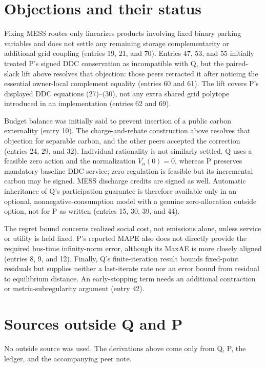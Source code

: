 \documentclass{article}
\begin{document}
\section*{Objections and their status}
Fixing MESS routes only linearizes products involving fixed binary parking
variables and does not settle any remaining storage complementarity or
additional grid coupling (entries 19, 21, and 70).  Entries 47, 53, and 55
initially treated P's signed DDC conservation as incompatible with Q, but the
paired-slack lift above resolves that objection: those peers retracted it
after noticing the essential owner-local complement equality (entries 60 and
61).  The lift covers P's displayed DDC equations (27)--(30), not any extra
shared grid polytope introduced in an implementation (entries 62 and 69).

Budget balance was initially said to prevent insertion of a public carbon
externality (entry 10).  The charge-and-rebate construction above resolves
that objection for separable carbon, and the other peers accepted the
correction (entries 24, 29, and 32).  Individual rationality is not similarly
settled.  Q uses a feasible zero action and the normalization \(V_n(0)=0\),
whereas P preserves mandatory baseline DDC service; zero regulation is
feasible but its incremental carbon may be signed.  MESS discharge credits
are signed as well.  Automatic inheritance of Q's participation guarantee is
therefore available only in an optional, nonnegative-consumption model with a
genuine zero-allocation outside option, not for P as written (entries 15, 30,
39, and 44).

The regret bound concerns realized social cost, not emissions alone, unless
service or utility is held fixed.  P's reported MAPE also does not directly
provide the required bus-time infinity-norm error, although its MaxAE is more
closely aligned (entries 8, 9, and 12).  Finally, Q's finite-iteration result
bounds fixed-point residuals but supplies neither a last-iterate rate nor an
error bound from residual to equilibrium distance.  An early-stopping term
needs an additional contraction or metric-subregularity argument (entry 42).

\section*{Sources outside Q and P}
No outside source was used.  The derivations above come only from Q, P, the
ledger, and the accompanying peer note.
\end{document}
